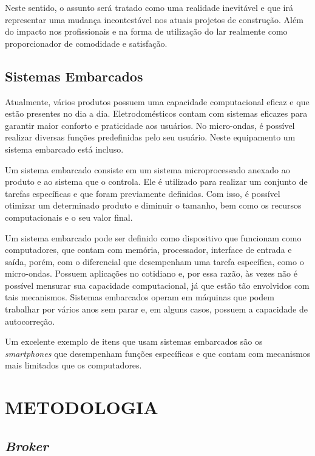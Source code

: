 \documentclass[
12pt,
openany, %
oneside, %
a4paper,			
english,			
brazil			        %
]{abntbibufjf}
\begin{document}
    Neste sentido, o assunto será tratado como uma realidade inevitável e que irá representar uma mudança incontestável nos atuais projetos de construção. Além do impacto nos profissionais e na forma de utilização do lar realmente como proporcionador de comodidade e satisfação.
    
    
    \section{Sistemas Embarcados}
    
    Atualmente, vários produtos possuem uma capacidade computacional eficaz e que estão presentes no dia a dia. Eletrodomésticos contam com sistemas eficazes para garantir maior conforto e praticidade aos usuários. No micro-ondas, é possível realizar diversas funções predefinidas pelo seu usuário. Neste equipamento um sistema embarcado está incluso.

    Um sistema embarcado consiste em um sistema microprocessado anexado ao produto e ao sistema que o controla. Ele é utilizado para realizar um conjunto de tarefas específicas e que foram previamente definidas. Com isso, é possível otimizar um determinado produto e diminuir o tamanho, bem como os recursos computacionais e o seu valor final. \cite{POZZEBOM}
    
    Um sistema embarcado pode ser definido como dispositivo que funcionam como computadores, que contam com memória, processador, interface de entrada e saída, porém, com o diferencial que desempenham uma tarefa específica, como o micro-ondas. Possuem aplicações no cotidiano e, por essa razão, às vezes não é possível mensurar sua capacidade computacional, já que estão tão envolvidos com tais mecanismos. Sistemas embarcados operam em máquinas que podem trabalhar por vários anos sem parar e, em alguns casos, possuem a capacidade de autocorreção.

    Um excelente exemplo de itens que usam sistemas embarcados são os \textit{smartphones} que desempenham funções específicas e que contam com mecanismos mais limitados que os computadores.

	\chapter{METODOLOGIA}
	\label{cap3}
	
	\section{\textit{Broker}}
	
\end{document}
